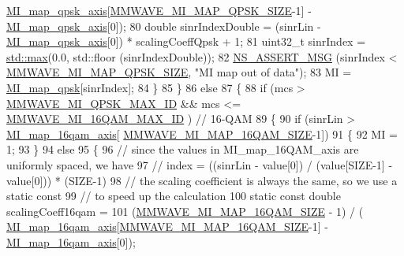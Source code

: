 \begin{DoxyCode}
      \hyperlink{namespacens3_a8170078bba1537f2165fdd97e9a49d0f}{MI\_map\_qpsk\_axis}[\hyperlink{namespacens3_a95f85ca0d071fe6fd4c1a5b731d945c8}{MMWAVE\_MI\_MAP\_QPSK\_SIZE}-1] - 
      \hyperlink{namespacens3_a8170078bba1537f2165fdd97e9a49d0f}{MI\_map\_qpsk\_axis}[0]);
80               \textcolor{keywordtype}{double} sinrIndexDouble = (sinrLin -  \hyperlink{namespacens3_a8170078bba1537f2165fdd97e9a49d0f}{MI\_map\_qpsk\_axis}[0]) * scalingCoeffQpsk 
      + 1;
81               uint32\_t sinrIndex = \hyperlink{80211b_8c_affe776513b24d84b39af8ab0930fef7f}{std::max}(0.0, std::floor (sinrIndexDouble));
82               \hyperlink{assert_8h_aff5ece9066c74e681e74999856f08539}{NS\_ASSERT\_MSG} (sinrIndex < \hyperlink{namespacens3_a95f85ca0d071fe6fd4c1a5b731d945c8}{MMWAVE\_MI\_MAP\_QPSK\_SIZE}, \textcolor{stringliteral}{"MI
       map out of data"});
83               MI = \hyperlink{namespacens3_a033a4853fbafa2f0685cfc40fafedac1}{MI\_map\_qpsk}[sinrIndex];
84             \}
85         \}
86       \textcolor{keywordflow}{else}
87         \{
88           \textcolor{keywordflow}{if} (mcs > \hyperlink{namespacens3_a08725fa6d069486f1625e23b79f05327}{MMWAVE\_MI\_QPSK\_MAX\_ID} && mcs <= 
      \hyperlink{namespacens3_accc1be2d986d75b75bfc1e6ab577d74a}{MMWAVE\_MI\_16QAM\_MAX\_ID} )  \textcolor{comment}{// 16-QAM}
89             \{
90               \textcolor{keywordflow}{if} (sinrLin > \hyperlink{namespacens3_a57654bbd0e78a79e8e20a7af14abe6c4}{MI\_map\_16qam\_axis}[
      \hyperlink{namespacens3_ae8c5f0c3c246a80749c417de3d0cbadc}{MMWAVE\_MI\_MAP\_16QAM\_SIZE}-1])
91                 \{
92                   MI = 1;
93                 \}
94               \textcolor{keywordflow}{else} 
95                 \{
96                   \textcolor{comment}{// since the values in MI\_map\_16QAM\_axis are uniformly spaced, we have}
97                   \textcolor{comment}{// index = ((sinrLin - value[0]) / (value[SIZE-1] - value[0])) * (SIZE-1)}
98                   \textcolor{comment}{// the scaling coefficient is always the same, so we use a static const}
99                   \textcolor{comment}{// to speed up the calculation}
100                   \textcolor{keyword}{static} \textcolor{keyword}{const} \textcolor{keywordtype}{double} scalingCoeff16qam = 
101                     (\hyperlink{namespacens3_ae8c5f0c3c246a80749c417de3d0cbadc}{MMWAVE\_MI\_MAP\_16QAM\_SIZE} - 1) / (
      \hyperlink{namespacens3_a57654bbd0e78a79e8e20a7af14abe6c4}{MI\_map\_16qam\_axis}[\hyperlink{namespacens3_ae8c5f0c3c246a80749c417de3d0cbadc}{MMWAVE\_MI\_MAP\_16QAM\_SIZE}-1] - 
      \hyperlink{namespacens3_a57654bbd0e78a79e8e20a7af14abe6c4}{MI\_map\_16qam\_axis}[0]);

\end{DoxyCode}
